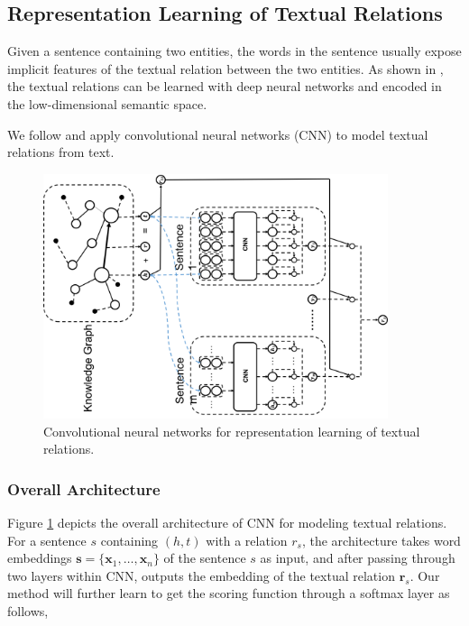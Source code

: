 \documentclass[11pt,a4paper]{article}
\begin{document}
\subsection{Representation Learning of Textual Relations}
\label{sec:relation}

Given a sentence containing two entities, the words in the sentence usually expose implicit features of the textual relation between the two entities. As shown in \cite{zeng2014relation,toutanova2015representing,lin2016neural}, the textual relations can be learned with deep neural networks and encoded in the low-dimensional semantic space.

We follow \cite{zeng2014relation,toutanova2015representing,lin2016neural} and apply convolutional neural networks (CNN) to model textual relations from text. 


\begin{figure}[!htbp]
\centering
\includegraphics[width=0.9\textwidth]{cnn.png}
\caption{Convolutional neural networks for representation learning of textual relations.}
\label{fig:cnn}
\end{figure}


\subsubsection{Overall Architecture}

Figure \ref{fig:cnn} depicts the overall architecture of CNN for modeling textual relations. For a sentence $s$ containing $(h, t)$ with a relation $r_s$, the architecture takes word embeddings $\mathbf{s} = \{\mathbf{x}_1, \ldots, \mathbf{x}_n \}$ of the sentence $s$ as input, and after passing through two layers within CNN, outputs the embedding of the textual relation $\mathbf{r}_{s}$. Our method will further learn to get the scoring function through a softmax layer as follows,
\end{document}
